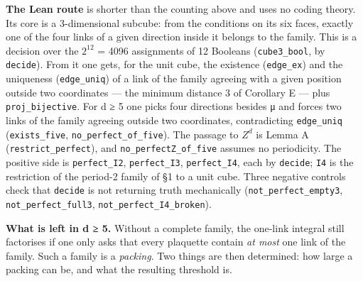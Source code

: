 \documentclass[11pt,a4paper]{article}
\theoremstyle{named}
\begin{document}
\textbf{The Lean route} is shorter than the counting above and uses no coding theory. Its core is a 3-dimensional subcube: from the conditions on its six faces, exactly one of the four links of a given direction inside it belongs to the family. This is a decision over the $2^{12}$ = 4096 assignments of 12 Booleans (\texttt{cube3\_\allowbreak{}bool}, by \texttt{decide}). From it one gets, for the unit cube, the existence (\texttt{edge\_\allowbreak{}ex}) and the uniqueness (\texttt{edge\_\allowbreak{}uniq}) of a link of the family agreeing with a given position outside two coordinates — the minimum distance 3 of Corollary E — plus \texttt{proj\_\allowbreak{}bijective}. For d ≥ 5 one picks four directions besides μ and forces two links of the family agreeing outside two coordinates, contradicting \texttt{edge\_\allowbreak{}uniq} (\texttt{exists\_\allowbreak{}five}, \texttt{no\_\allowbreak{}perfect\_\allowbreak{}of\_\allowbreak{}five}). The passage to $Z^d$ is Lemma A (\texttt{restrict\_\allowbreak{}perfect}), and \texttt{no\_\allowbreak{}perfectZ\_\allowbreak{}of\_\allowbreak{}five} assumes no periodicity. The positive side is \texttt{perfect\_\allowbreak{}I2}, \texttt{perfect\_\allowbreak{}I3}, \texttt{perfect\_\allowbreak{}I4}, each by \texttt{decide}; \texttt{I4} is the restriction of the period-2 family of §1 to a unit cube. Three negative controls check that \texttt{decide} is not returning truth mechanically (\texttt{not\_\allowbreak{}perfect\_\allowbreak{}empty3}, \texttt{not\_\allowbreak{}perfect\_\allowbreak{}full3}, \texttt{not\_\allowbreak{}perfect\_\allowbreak{}I4\_\allowbreak{}broken}).

\textbf{What is left in d ≥ 5.} Without a complete family, the one-link integral still factorises if one only asks that every plaquette contain \textit{at most} one link of the family. Such a family is a \textit{packing}. Two things are then determined: how large a packing can be, and what the resulting threshold is.
\end{document}
